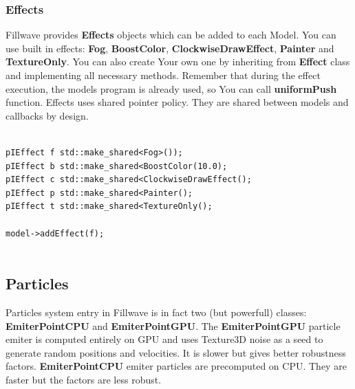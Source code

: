 \documentclass{article}
\begin{document}
\subsubsection{Effects}\label{sec:Effects}
\indent \indent Fillwave provides \textbf{Effects} objects which can be added to each Model. You can use built in effects: \textbf{Fog}, \textbf{BoostColor}, \textbf{ClockwiseDrawEffect}, \textbf{Painter} and \textbf{TextureOnly}. You can also create Your own one by inheriting from \textbf{Effect} class and implementing all necessary methods. Remember that during the effect execution, the models program is already used, so You can call \textbf{uniformPush} function. Effects uses shared pointer policy. They are shared between models and callbacks by design.

\begin{lstlisting}

pIEffect f std::make_shared<Fog>());
pIEffect b std::make_shared<BoostColor(10.0);
pIEffect c std::make_shared<ClockwiseDrawEffect();
pIEffect p std::make_shared<Painter();
pIEffect t std::make_shared<TextureOnly();

model->addEffect(f);
   
\end{lstlisting}

\subsection{Particles}\label{sec:Particles}
\indent \indent Particles system entry in Fillwave is in fact two (but powerfull) classes: \textbf{EmiterPointCPU} and \textbf{EmiterPointGPU}. The \textbf{EmiterPointGPU} particle emiter is computed entirely on GPU and uses Texture3D noise as a seed to generate random positions and velocities. It is slower but gives better robustness factors. \textbf{EmiterPointCPU} emiter particles are precomputed on CPU. They are faster but the factors are less robust.
\end{document}
